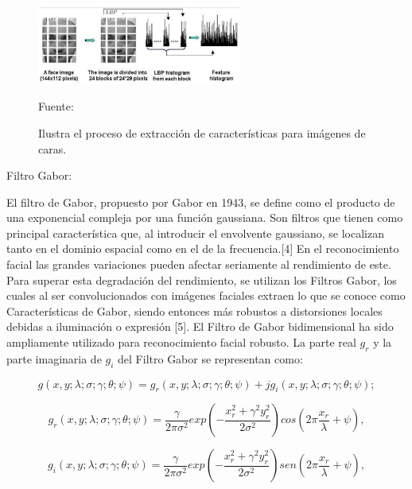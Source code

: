 \begin{enumerate}
\begin{figure}[ht]
\begin{center}
\includegraphics[width=0.6\textwidth]{Imagen23}
\end{center}
\begin{center}
\vskip -0.5cm
\caption{\small{Ilustra el proceso de extracción de características para imágenes de caras.}}
{\small{Fuente: \cite{FALTA}}}
\end{center}
\end{figure}

{\bf\item Filtro Gabor:} \vskip 0.1cm
El filtro de Gabor, propuesto por Gabor en 1943, se define como el producto de una exponencial compleja por una función gaussiana. Son filtros que tienen como principal característica que, al introducir el envolvente gaussiano, se localizan tanto en el dominio espacial como en el de la frecuencia.[4]
\vskip 0.1cm
En el reconocimiento facial las grandes variaciones pueden afectar seriamente al rendimiento de este. Para superar esta degradación del rendimiento, se utilizan los Filtros Gabor, los cuales al ser convolucionados con imágenes faciales extraen lo que se conoce como Características de Gabor, siendo entonces más robustos a distorsiones locales debidas a iluminación o expresión [5].
\vskip 0.1cm
El Filtro de Gabor bidimensional ha sido ampliamente utilizado para reconocimiento facial robusto. La parte real $g_{r}$ y la parte imaginaria de $g_{i}$ del Filtro Gabor se representan como: 

\begin{equation}
g(x, y; \lambda; \sigma; \gamma; \theta; \psi) = g_{r}(x, y; \lambda; \sigma; \gamma; \theta; \psi)+j g_{i}(x, y; \lambda; \sigma; \gamma; \theta; \psi);
\end{equation}

\begin{equation}
g_{r}(x, y; \lambda; \sigma; \gamma; \theta; \psi) = \frac{\gamma}{2\pi\sigma^{2}}exp(-\frac{x_r^2+\gamma^2y_r^2}{2\sigma^2})cos(2\pi\frac{x_{r}}{\lambda}+\psi), 
\end{equation}

\begin{equation}
g_{i}(x, y; \lambda; \sigma; \gamma; \theta; \psi) = \frac{\gamma}{2\pi\sigma^{2}}exp(-\frac{x_r^2+\gamma^2y_r^2}{2\sigma^2})sen(2\pi\frac{x_{r}}{\lambda}+\psi), 
\end{equation}


\end{enumerate}
